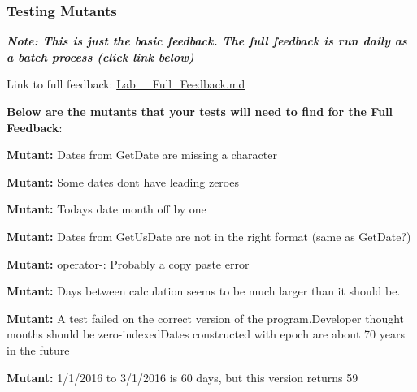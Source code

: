 \subsubsection*{Testing Mutants}

{\itshape {\bfseries{Note\+: This is just the basic feedback. The full feedback is run daily as a batch process (click link below)}}}

Link to full feedback\+: \mbox{\hyperlink{md__lab_06__full__feedback}{Lab\+\_\+\_\+\+Full\+\_\+\+Feedback.md}}

{\bfseries{Below are the mutants that your tests will need to find for the Full Feedback}}\+:


\begin{DoxyItemize}
\item {\bfseries{Mutant\+:}} Dates from Get\+Date are missing a character
\item {\bfseries{Mutant\+:}} Some dates dont have leading zeroes
\item {\bfseries{Mutant\+:}} Todays date month off by one
\item {\bfseries{Mutant\+:}} Dates from Get\+Us\+Date are not in the right format (same as Get\+Date?)
\item {\bfseries{Mutant\+:}} operator-\/\+: Probably a copy paste error
\item {\bfseries{Mutant\+:}} Days between calculation seems to be much larger than it should be.
\item {\bfseries{Mutant\+:}} A test failed on the correct version of the program.\+Developer thought months should be zero-\/indexed\+Dates constructed with epoch are about 70 years in the future
\item {\bfseries{Mutant\+:}} 1/1/2016 to 3/1/2016 is 60 days, but this version returns 59 
\end{DoxyItemize}